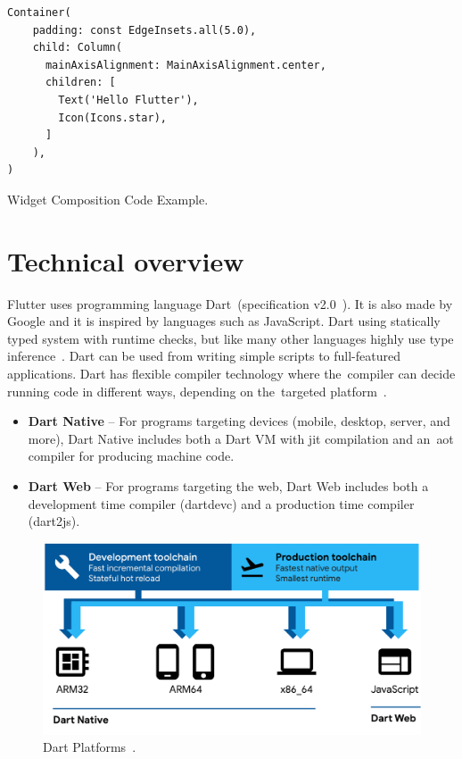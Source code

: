 \begin{listing}[ht]
\begin{verbatim}
Container(
    padding: const EdgeInsets.all(5.0),
    child: Column(
      mainAxisAlignment: MainAxisAlignment.center,
      children: [
        Text('Hello Flutter'),
        Icon(Icons.star),
      ]
    ),
)
\end{verbatim}
\caption{Widget Composition Code Example.}
\label{listing:hello-flutter}
\end{listing}
\section{Technical overview}
Flutter uses programming language Dart~(specification v2.0~\cite{dart-specs}). It is also made by Google and it is inspired by languages such as JavaScript. Dart using statically typed system with runtime checks, but like many other languages highly use type inference~\cite{dart-type-system}. Dart can be used from writing simple scripts to full-featured applications. Dart has flexible compiler technology where the~compiler can decide running code in different ways, depending on the~targeted platform~\cite{dart-platforms}. 

\begin{itemize}
    \item \textbf{Dart Native} -- For programs targeting devices (mobile, desktop, server, and more), Dart Native includes both a Dart VM with \gls{jit} compilation and an~\gls{aot} compiler for producing machine code.
    \item \textbf{Dart Web} -- For programs targeting the web, Dart Web includes both a development time compiler (dartdevc) and a production time compiler (dart2js).
\end{itemize}

\begin{figure}[htp]
    \centering
    \includegraphics[width=0.8\linewidth]{img/flutter/dart-platforms.pdf}
    \caption{Dart Platforms~\cite{dart-platforms}.}
    \label{fig:dart-platform}
\end{figure}

